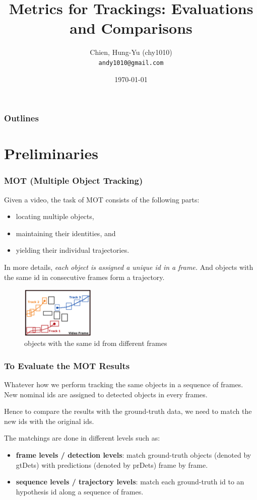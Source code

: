 \documentclass[slidetop, mathserif]{beamer}
\title[Metrics for Tracking]{Metrics for Trackings: Evaluations and Comparisons}
\author[chy1010]{Chien, Hung-Yu (chy1010) \\ {\tt andy1010@gmail.com}}
\date{\today}
\begin{document}
\frame{\titlepage}

\section[Outline]{}
\begin{frame}
    \frametitle{Outlines}
    \tableofcontents
\end{frame}

\section{Preliminaries}

\begin{frame}
	\frametitle{MOT (Multiple Object Tracking)}
	
	Given a video, the task of MOT consists of the following parts:
	\begin{itemize}
		\item locating multiple objects,
		\item maintaining their identities, and
		\item yielding their individual trajectories.
	\end{itemize}
	
	In more details, \emph{each object is assigned a unique id in a frame.}
	And objects with the same id in consecutive frames form a trajectory.
	
	\begin{figure}
		\includegraphics[height=70pt]{pics/fig1.png}
		\caption{objects with the same id from different frames}
	\end{figure}
	
\end{frame}

\begin{frame}
	\frametitle{To Evaluate the MOT Results}
	
	Whatever how we perform tracking the same objects in a sequence of frames.
	New nominal ids are assigned to detected objects in every frames.
	
	Hence to compare the results with the ground-truth data, we need to match the new ids
	with the original ids.
	
	The matchings are done in different levels such as:
	\begin{itemize}
		\item {\bf frame levels / detection levels}:
		      match ground-truth objects (denoted by gtDets)
		      with predictions (denoted by prDets) frame by frame.
		\item {\bf sequence levels / trajectory levels}:
		      match each ground-truth id to an hypothesis id along a sequence of frames.
	\end{itemize}
	
\end{frame}
\end{document}
